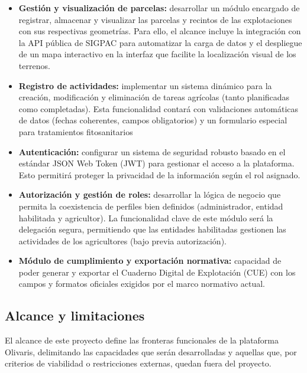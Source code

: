 \begin{itemize}
    \item \textbf{Gestión y visualización de parcelas:} desarrollar un módulo encargado de registrar, almacenar y visualizar las parcelas y recintos de las explotaciones con sus respectivas geometrías. Para ello, el alcance 
    incluye la integración con la API pública de SIGPAC para automatizar la carga de datos y el despliegue de un mapa interactivo en la interfaz que facilite la localización visual de los terrenos.

    \item \textbf{Registro de actividades:} implementar un sistema dinámico para la creación, modificación y eliminación de tareas agrícolas (tanto planificadas como completadas). Esta funcionalidad contará con 
    validaciones automáticas de datos (fechas coherentes, campos obligatorios) y un formulario especial para tratamientos fitosanitarios

    \item \textbf{Autenticación:} configurar un sistema de seguridad robusto basado en el estándar JSON Web Token (JWT) para gestionar el acceso a la plataforma. Esto permitirá proteger la privacidad de la información 
    según el rol asignado.

    \item \textbf{Autorización y gestión de roles:} desarrollar la lógica de negocio que permita la coexistencia de perfiles bien definidos (administrador, entidad habilitada y agricultor). La funcionalidad clave de este 
    módulo será la delegación segura, permitiendo que las entidades habilitadas gestionen las actividades de los agricultores (bajo previa autorización).

    \item \textbf{Módulo de cumplimiento y exportación normativa:} capacidad de poder generar y exportar el Cuaderno Digital de Explotación (CUE) con los campos y formatos oficiales exigidos por el marco normativo actual.
\end{itemize}

\subsection{Alcance y limitaciones}

El alcance de este proyecto define las fronteras funcionales de la plataforma Olivaris, delimitando las capacidades que serán desarrolladas y aquellas que, por criterios de viabilidad o restricciones externas, quedan fuera del 
proyecto.

